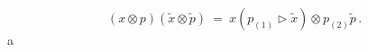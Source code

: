 \begin{equation}(x\otimes p)(\tilde{x}\otimes \tilde{p})
\ = \ x(p_{(1)}\triangleright \tilde{x})\otimes p_{(2)}\tilde{p}\,
.\label{r319}\end{equation}a

